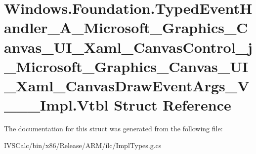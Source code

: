 \hypertarget{struct_windows_1_1_foundation_1_1_typed_event_handler___a___microsoft___graphics___canvas___u_i_7045254f1fb5f8f677eb76388133052d}{}\section{Windows.\+Foundation.\+Typed\+Event\+Handler\+\_\+\+A\+\_\+\+Microsoft\+\_\+\+Graphics\+\_\+\+Canvas\+\_\+\+U\+I\+\_\+\+Xaml\+\_\+\+Canvas\+Control\+\_\+j\+\_\+\+Microsoft\+\_\+\+Graphics\+\_\+\+Canvas\+\_\+\+U\+I\+\_\+\+Xaml\+\_\+\+Canvas\+Draw\+Event\+Args\+\_\+\+V\+\_\+\+\_\+\+\_\+\+Impl.\+Vtbl Struct Reference}
\label{struct_windows_1_1_foundation_1_1_typed_event_handler___a___microsoft___graphics___canvas___u_i_7045254f1fb5f8f677eb76388133052d}


The documentation for this struct was generated from the following file\+:\begin{DoxyCompactItemize}
\item 
I\+V\+S\+Calc/bin/x86/\+Release/\+A\+R\+M/ilc/Impl\+Types.\+g.\+cs\end{DoxyCompactItemize}
